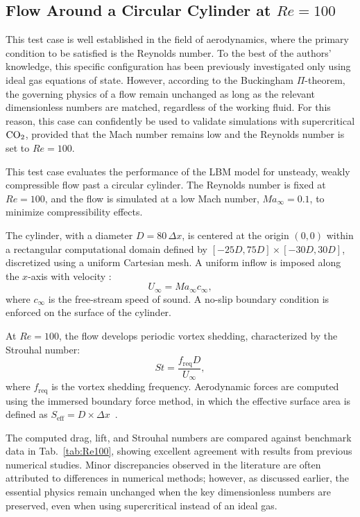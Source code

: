 \subsection{Flow Around a Circular Cylinder at \texorpdfstring{$Re = 100$}{Re =
100}}

This test case is well established in the field of aerodynamics, where the
primary condition to be satisfied is the Reynolds number. To the best of the
authors' knowledge, this specific configuration has been previously investigated
only using ideal gas equations of state. However, according to the Buckingham
\(\Pi\)-theorem, the governing physics of a flow remain unchanged as long as the
relevant dimensionless numbers are matched, regardless of the working fluid. For
this reason, this case can confidently be used to validate simulations with
supercritical \(\ce{CO2}\), provided that the Mach number remains low and the
Reynolds number is set to \(Re = 100\).

This test case evaluates the performance of the LBM model for unsteady, weakly
compressible flow past a circular cylinder. The Reynolds number is fixed at \(Re
= 100\), and the flow is simulated at a low Mach number, \(M\!a_\infty = 0.1\),
to minimize compressibility effects.

The cylinder, with a diameter \(D = 80\,\Delta x\), is centered at the origin
\((0, 0)\) within a rectangular computational domain defined by \([{-}25D, 75D]
\times [{-}30D, 30D]\), discretized using a uniform Cartesian mesh. A uniform
inflow is imposed along the \(x\)-axis with velocity :
\[
U_\infty = M\!a_\infty c_\infty,
\]
where \(c_\infty\) is the free-stream speed of sound. A no-slip boundary
condition is enforced on the surface of the cylinder.

At \(Re = 100\), the flow develops periodic vortex shedding, characterized by
the Strouhal number:
\[
St = \frac{f_{\text{req}} D}{U_\infty},
\]
where \(f_{\text{req}}\) is the vortex shedding frequency. Aerodynamic forces
are computed using the immersed boundary force method, in which the effective
surface area is defined as \(S_{\text{eff}} = D \times \Delta
x\)~\cite{cheylan2022analysis}.

The computed drag, lift, and Strouhal numbers are compared against benchmark
data in Tab.~\ref{tab:Re100}, showing excellent agreement with results from
previous numerical studies. Minor discrepancies observed in the literature are
often attributed to differences in numerical methods; however, as discussed
earlier, the essential physics remain unchanged when the key dimensionless
numbers are preserved, even when using supercritical  instead of an
ideal gas.

